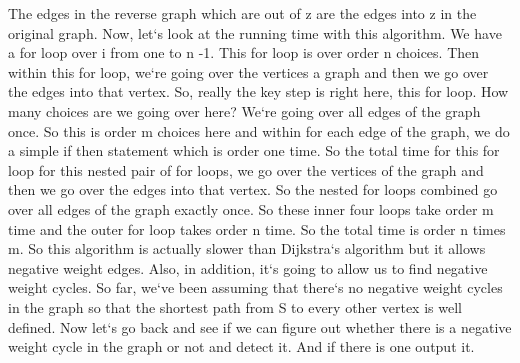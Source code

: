 The edges in the reverse graph which are out of z are the edges into z in the original graph.
Now, let`s look at the running time with this algorithm.
We have a for loop over i from one to n -1.
This for loop is over order n choices.
Then within this for loop, we`re going over the vertices a graph and then we go over the edges into that vertex.
So, really the key step is right here, this for loop.
How many choices are we going over here? We`re going over all edges of the graph once.
So this is order m choices here and within for each edge of the graph, we do a simple if then statement which is order one time.
So the total time for this for loop for this nested pair of for loops, we go over the vertices of the graph and then we go over the edges into that vertex.
So the nested for loops combined go over all edges of the graph exactly once.
So these inner four loops take order m time and the outer for loop takes order n time.
So the total time is order n times m.
So this algorithm is actually slower than Dijkstra`s algorithm but it allows negative weight edges.
Also, in addition, it`s going to allow us to find negative weight cycles.
So far, we`ve been assuming that there`s no negative weight cycles in the graph so that the shortest path from S to every other vertex is well defined.
Now let`s go back and see if we can figure out whether there is a negative weight cycle in the graph or not and detect it.
And if there is one output it.

